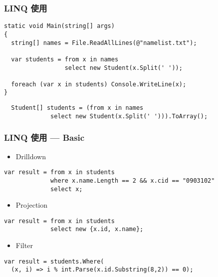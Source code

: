 \begin{frame}[fragile]
\frametitle{LINQ 使用}

\begin{lstlisting}
static void Main(string[] args)
{
  string[] names = File.ReadAllLines(@"namelist.txt");

  var students = from x in names
                 select new Student(x.Split(' '));
  
  foreach (var x in students) Console.WriteLine(x);
}
\end{lstlisting}

\begin{lstlisting}
  Student[] students = (from x in names
             select new Student(x.Split(' '))).ToArray();
\end{lstlisting}
\end{frame}


\begin{frame}[fragile]
\frametitle{LINQ 使用 --- Basic}
\begin{itemize}
\item Drilldown
\end{itemize}
\begin{lstlisting}
var result = from x in students
             where x.name.Length == 2 && x.cid == "0903102"
             select x;
\end{lstlisting}
\begin{itemize}
\item Projection
\end{itemize}
\begin{lstlisting}
var result = from x in students
             select new {x.id, x.name};
\end{lstlisting}
\begin{itemize}
\item Filter
\end{itemize}
\begin{lstlisting}
var result = students.Where(
  (x, i) => i % int.Parse(x.id.Substring(8,2)) == 0);
\end{lstlisting}
\end{frame}

